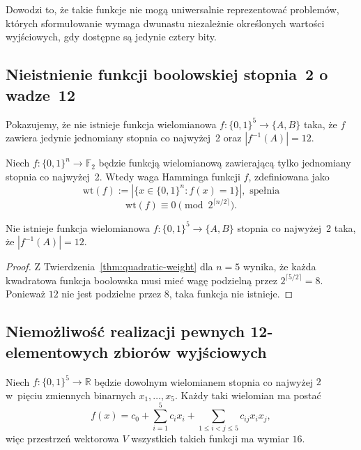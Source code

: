 Dowodzi to, że takie funkcje nie mogą uniwersalnie reprezentować problemów, których sformułowanie wymaga dwunastu niezależnie określonych wartości wyjściowych, gdy dostępne są jedynie cztery bity.

\subsection{Nieistnienie funkcji boolowskiej stopnia~2 o wadze~12}

Pokazujemy, że nie istnieje funkcja wielomianowa $f: \{0,1\}^5 \to \{A, B\}$ taka, że $f$ zawiera jedynie jednomiany stopnia co najwyżej~2 oraz $|f^{-1}(A)| = 12$.

\begin{theorem}
\label{thm:quadratic-weight}
Niech $f: \{0,1\}^n \to \mathbb{F}_2$ będzie funkcją wielomianową zawierającą tylko jednomiany stopnia co najwyżej~2. Wtedy waga Hamminga funkcji $f$, zdefiniowana jako
\begin{equation}
\mathrm{wt}(f) := |\{x \in \{0,1\}^n : f(x) = 1\}|,
\text{ spełnia}
\end{equation}
\begin{equation}
    \mathrm{wt}(f) \equiv 0 \pmod{2^{\lceil n/2 \rceil}}.
\end{equation}
\end{theorem}

\begin{corollary}
Nie istnieje funkcja wielomianowa $f: \{0,1\}^5 \to \{A, B\}$ stopnia co najwyżej~2 taka, że $|f^{-1}(A)| = 12$.
\end{corollary}


\begin{proof}
Z Twierdzenia~\ref{thm:quadratic-weight} dla $n = 5$ wynika, że każda kwadratowa funkcja boolowska musi mieć wagę podzielną przez $2^{\lceil 5/2 \rceil} = 8$. Ponieważ $12$ nie jest podzielne przez $8$, taka funkcja nie istnieje.
\end{proof}


\subsection{Niemożliwość realizacji pewnych 12-elementowych zbiorów wyjściowych}

Niech $f:\{0,1\}^5 \to \mathbb{R}$ będzie dowolnym wielomianem stopnia co najwyżej $2$ w~pięciu zmiennych binarnych $x_1,\dots,x_5$. Każdy taki wielomian ma postać
\begin{equation}
f(x) = c_0 + \sum_{i=1}^5 c_i x_i + \sum_{1\le i<j\le 5} c_{ij} x_i x_j,
\end{equation}
więc przestrzeń wektorowa $V$ wszystkich takich funkcji ma wymiar $16$.

